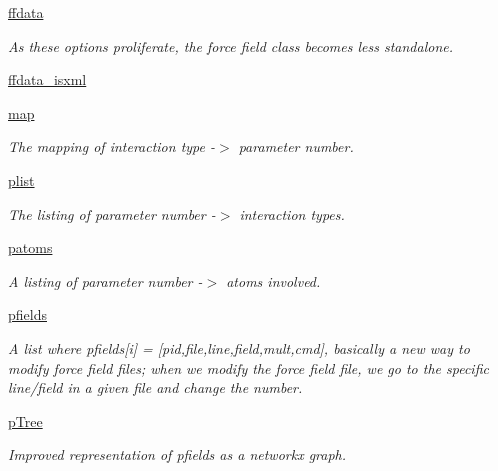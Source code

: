 \begin{DoxyCompactItemize}
\item 
\hyperlink{classsrc_1_1forcefield_1_1FF_a6cfb305bb2e714f4bae9ce08379ac8a9}{ffdata}
\begin{DoxyCompactList}\small\item\em As these options proliferate, the force field class becomes less standalone. \end{DoxyCompactList}\item 
\hyperlink{classsrc_1_1forcefield_1_1FF_ace3214e3e4146833be44b9691a3fa90b}{ffdata\+\_\+isxml}
\item 
\hyperlink{classsrc_1_1forcefield_1_1FF_a699736e536c0b85ba5a8c6ecc56fc98a}{map}
\begin{DoxyCompactList}\small\item\em The mapping of interaction type -\/$>$ parameter number. \end{DoxyCompactList}\item 
\hyperlink{classsrc_1_1forcefield_1_1FF_a8feb2e88366fb38ccc3d3ffa70c10a2c}{plist}
\begin{DoxyCompactList}\small\item\em The listing of parameter number -\/$>$ interaction types. \end{DoxyCompactList}\item 
\hyperlink{classsrc_1_1forcefield_1_1FF_abb9238d4cdfc53e906ce930590505662}{patoms}
\begin{DoxyCompactList}\small\item\em A listing of parameter number -\/$>$ atoms involved. \end{DoxyCompactList}\item 
\hyperlink{classsrc_1_1forcefield_1_1FF_a969afaf2339d5323370c6683224c7982}{pfields}
\begin{DoxyCompactList}\small\item\em A list where pfields\mbox{[}i\mbox{]} = \mbox{[}pid,\textquotesingle{}file\textquotesingle{},line,field,mult,cmd\mbox{]}, basically a new way to modify force field files; when we modify the force field file, we go to the specific line/field in a given file and change the number. \end{DoxyCompactList}\item 
\hyperlink{classsrc_1_1forcefield_1_1FF_a18e33593a1e15322c77802cefdb34ac5}{p\+Tree}
\begin{DoxyCompactList}\small\item\em Improved representation of pfields as a networkx graph. \end{DoxyCompactList}\item 

\end{DoxyCompactItemize}
